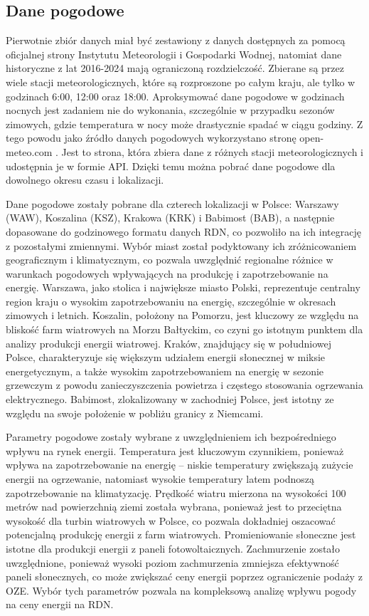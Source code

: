 \subsection{Dane pogodowe}
Pierwotnie zbiór danych miał być zestawiony z danych dostępnych za pomocą oficjalnej strony Instytutu Meteorologii i Gospodarki Wodnej, natomiat dane historyczne z lat 2016-2024 mają ograniczoną rozdzielczość. Zbierane są przez wiele stacji meteorologicznych, które są rozproszone po całym kraju, ale tylko w godzinach 6:00, 12:00 oraz 18:00. Aproksymować dane pogodowe w godzinach nocnych jest zadaniem nie do wykonania, szczególnie w przypadku sezonów zimowych, gdzie temperatura w nocy może drastycznie spadać w ciągu godziny. Z tego powodu jako źródło danych pogodowych wykorzystano stronę open-meteo.com \cite{METEO}. Jest to strona, która zbiera dane z różnych stacji meteorologicznych i udostępnia je w formie API. Dzięki temu można pobrać dane pogodowe dla dowolnego okresu czasu i lokalizacji.

Dane pogodowe zostały pobrane dla czterech lokalizacji w Polsce: Warszawy (WAW), Koszalina (KSZ), Krakowa (KRK) i Babimost (BAB), a następnie dopasowane do godzinowego formatu danych RDN, co pozwoliło na ich integrację z pozostałymi zmiennymi. Wybór miast został podyktowany ich zróżnicowaniem geograficznym i klimatycznym, co pozwala uwzględnić regionalne różnice w warunkach pogodowych wpływających na produkcję i zapotrzebowanie na energię. Warszawa, jako stolica i największe miasto Polski, reprezentuje centralny region kraju o wysokim zapotrzebowaniu na energię, szczególnie w okresach zimowych i letnich. Koszalin, położony na Pomorzu, jest kluczowy ze względu na bliskość farm wiatrowych na Morzu Bałtyckim, co czyni go istotnym punktem dla analizy produkcji energii wiatrowej. Kraków, znajdujący się w południowej Polsce, charakteryzuje się większym udziałem energii słonecznej w miksie energetycznym, a także wysokim zapotrzebowaniem na energię w sezonie grzewczym z powodu zanieczyszczenia powietrza i częstego stosowania ogrzewania elektrycznego. Babimost, zlokalizowany w zachodniej Polsce, jest istotny ze względu na swoje położenie w pobliżu granicy z Niemcami.

Parametry pogodowe zostały wybrane z uwzględnieniem ich bezpośredniego wpływu na rynek energii. Temperatura jest kluczowym czynnikiem, ponieważ wpływa na zapotrzebowanie na energię – niskie temperatury zwiększają zużycie energii na ogrzewanie, natomiast wysokie temperatury latem podnoszą zapotrzebowanie na klimatyzację. Prędkość wiatru mierzona na wysokości 100 metrów nad powierzchnią ziemi została wybrana, ponieważ jest to przeciętna wysokość dla turbin wiatrowych w Polsce, co pozwala dokładniej oszacować potencjalną produkcję energii z farm wiatrowych. Promieniowanie słoneczne jest istotne dla produkcji energii z paneli fotowoltaicznych. Zachmurzenie zostało uwzględnione, ponieważ wysoki poziom zachmurzenia zmniejsza efektywność paneli słonecznych, co może zwiększać ceny energii poprzez ograniczenie podaży z OZE. Wybór tych parametrów pozwala na kompleksową analizę wpływu pogody na ceny energii na RDN.

